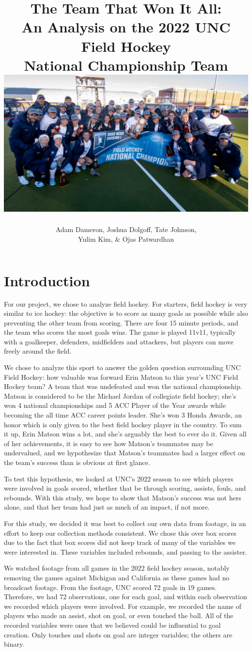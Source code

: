 \documentclass{article} %
\title{The Team That Won It All:\\
	\vspace*{0.5cm}
\large An Analysis on the 2022 UNC Field Hockey\\
National Championship Team\\
\vspace*{1cm}
\includegraphics[width=\textwidth]{champions.jpg}}
\author{Adam Dameron, Joshua Dolgoff, Tate Johnson, \\
	Yulim Kim, \& Ojas Patwardhan
}
\begin{document}
\maketitle
\newpage
\section{Introduction}

For our project, we chose to analyze field hockey. For starters, field hockey is very similar to ice hockey: the objective is to score as many goals as possible while also preventing the other team from scoring. There are four 15 minute periods, and the team who scores the most goals wins. The game is played 11v11, typically with a goalkeeper, defenders, midfielders and attackers, but players can move freely around the field.

We chose to analyze this sport to answer the golden question surrounding UNC Field Hockey: how valuable was forward Erin Matson to this year’s UNC Field Hockey team? A team that was undefeated and won the national championship. Matson is considered to be the Michael Jordan of collegiate field hockey; she’s won 4 national championships and 5 ACC Player of the Year awards while becoming the all time ACC career points leader. She’s won 3 Honda Awards, an honor which is only given to the best field hockey player in the country. To sum it up, Erin Matson wins a lot, and she’s arguably the best to ever do it. Given all of her achievements, it is easy to see how Matson’s teammates may be undervalued, and we hypothesize that Matson’s teammates had a larger effect on the team’s success than is obvious at first glance.

To test this hypothesis, we looked at UNC’s 2022 season to see which players were involved in goals scored, whether that be through scoring, assists, fouls, and rebounds. With this study, we hope to show that Matson’s success was not hers alone, and that her team had just as much of an impact, if not more.

For this study, we decided it was best to collect our own data from footage, in an effort to keep our collection methods consistent. We chose this over box scores due to the fact that box scores did not keep track of many of the variables we were interested in. These variables included rebounds, and passing to the assister. 

We watched footage from all games in the 2022 field hockey season, notably removing the games against Michigan and California as these games had no broadcast footage. From the footage, UNC scored 72 goals in 19 games. Therefore, we had 72 observations, one for each goal, and within each observation we recorded which players were involved. For example, we recorded the name of players who made an assist, shot on goal, or even touched the ball. All of the recorded variables were ones that we believed could be influential to goal creation. Only touches and shots on goal are integer variables; the others are binary.
\FloatBarrier
\end{document}
